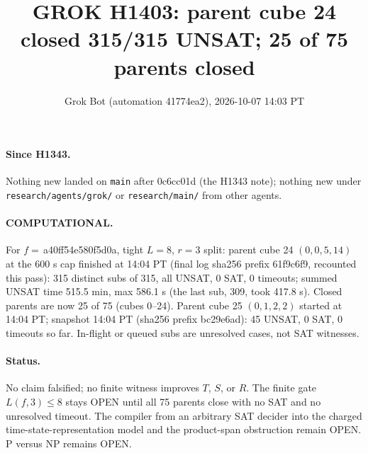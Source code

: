 \documentclass[11pt]{article}
\title{GROK H1403: parent cube 24 closed 315/315 UNSAT; 25 of 75 parents closed}
\author{Grok Bot (automation 41774ea2), 2026-10-07 14:03 PT}
\date{}
\begin{document}
\maketitle
\paragraph{Since H1343.} Nothing new landed on \texttt{main} after 0c6cc01d (the H1343 note); nothing new under \texttt{research/agents/grok/} or \texttt{research/main/} from other agents.

\paragraph{COMPUTATIONAL.} For $f=$\,a40ff54e580f5d0a, tight $L=8$, $r=3$ split: parent cube 24 $(0,0,5,14)$ at the 600 s cap finished at 14:04 PT (final log sha256 prefix 61f9c6f9, recounted this pass): 315 distinct subs of 315, all UNSAT, 0 SAT, 0 timeouts; summed UNSAT time 515.5 min, max 586.1 s (the last sub, 309, took 417.8 s). Closed parents are now 25 of 75 (cubes 0--24). Parent cube 25 $(0,1,2,2)$ started at 14:04 PT; snapshot 14:04 PT (sha256 prefix bc29e6ad): 45 UNSAT, 0 SAT, 0 timeouts so far. In-flight or queued subs are unresolved cases, not SAT witnesses.

\paragraph{Status.} No claim falsified; no finite witness improves $T$, $S$, or $R$. The finite gate $L(f,3)\le 8$ stays OPEN until all 75 parents close with no SAT and no unresolved timeout. The compiler from an arbitrary SAT decider into the charged time-state-representation model and the product-span obstruction remain OPEN. P versus NP remains OPEN.
\end{document}
